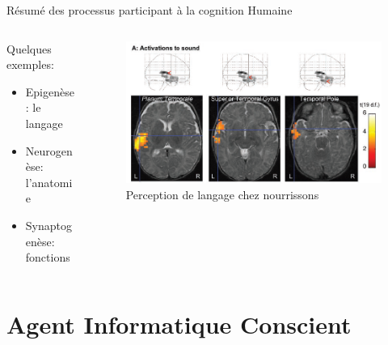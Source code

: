 \documentclass{beamer}
\begin{document}
\begin{frame}{Résumé des processus participant à la cognition Humaine}
\begin{columns}
\begin{column}{0.5\textwidth}
\begin{block}{}
Quelques exemples:
\begin{itemize}
    \item Epigenèse: le langage
    \item Neurogenèse: l'anatomie
    \item Synaptogenèse: fonctions
\end{itemize}
\end{block}
\end{column}
\begin{column}{0.4\textwidth}
\begin{block}{}
\begin{figure}
    \centering
    \includegraphics[width=\textwidth]{childLanguagePerception.png}
    \caption{Perception de langage chez nourrissons}
    \label{fig:synapto}
\end{figure}
\end{block}
\end{column}
\end{columns}
\end{frame}

\section{Agent Informatique Conscient}
\end{document}
